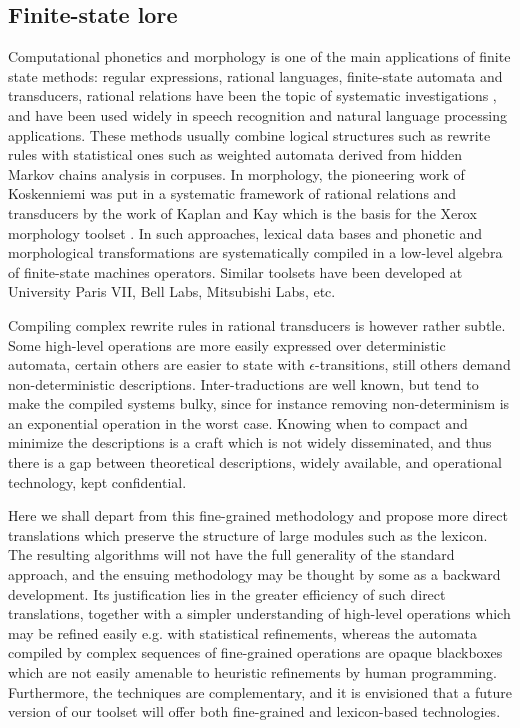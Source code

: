 \documentclass[12pt]{article}
\begin{document}
\subsection{Finite-state lore}

Computational phonetics and morphology is one of the main applications
of finite state methods: regular expressions, rational languages, 
finite-state automata and transducers, rational relations have been the
topic of systematic investigations \cite{mohri, rs2}, and have been used widely
in speech recognition and natural language processing applications.
These methods usually combine logical structures such as rewrite rules 
with statistical ones such as weighted automata derived from hidden Markov
chains analysis in corpuses. In morphology, the pioneering work of
Koskenniemi \cite{kosk} was put in a systematic framework of rational relations
and transducers by the work of Kaplan and Kay \cite{kk} which is the basis for
the Xerox morphology toolset \cite{karttunen1,karttunen2,beeskar}.
In such approaches, lexical data bases and phonetic and morphological
transformations are systematically compiled in a low-level algebra of 
finite-state machines operators. Similar toolsets have been developed at
University Paris VII, Bell Labs, Mitsubishi Labs, etc.

Compiling complex rewrite rules in rational transducers is however rather
subtle. Some high-level operations are more easily expressed over deterministic
automata, certain others are easier to state with $\epsilon$-transitions,
still others demand non-deterministic descriptions. Inter-traductions are
well known, but tend to make the compiled systems bulky, since for instance
removing non-determinism is an exponential operation in the worst case. 
Knowing when to compact and minimize the descriptions is a craft which is 
not widely disseminated, and thus there is a gap between theoretical
descriptions, widely available, and operational technology, kept confidential.

Here we shall depart from this fine-grained methodology and propose more
direct translations which preserve the structure of large modules such
as the lexicon. The resulting algorithms will not have the full generality
of the standard approach, and the ensuing methodology may be thought by some
as a backward development. Its justification lies in the greater efficiency
of such direct translations, together with a simpler understanding of
high-level operations which may be refined easily e.g. with statistical 
refinements, whereas the automata compiled by complex sequences of 
fine-grained operations are opaque blackboxes which are not easily
amenable to heuristic refinements by human programming. Furthermore, the
techniques are complementary, and 
it is envisioned that a future version of our %
toolset will offer both fine-grained and lexicon-based technologies. 
\end{document}
